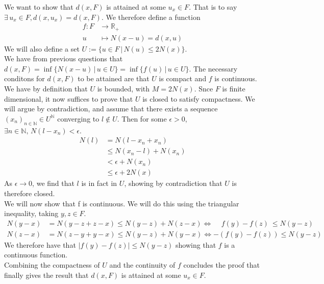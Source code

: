 \documentclass{article}
\begin{document}
We want to show that $d(x,F)$ is attained at some $u_x\in F$. That is to say $\exists \, u_x \in F, d(x,u_x) = d(x,F)$. We therefore define a function
	\begin{align*}
	f: F &\to \mathbb{R}_+\\
	u &\mapsto N(x-u) = d(x,u)
	\end{align*}
We will also define a set $U := \{u \in F \, | \, N(u) \leq 2N(x)\}$.\\ 
\noindent We have from previous questions that $d(x,F) = \inf\{ N(x-u) \, | \, u \in U\} = \inf\{ f(u) \, | \, u \in U\}$. The necessary conditons for $d(x,F)$ to be attained are that $U$ is compact and $f$ is continuous.\\
\noindent We have by definition that $U$ is bounded, with $M = 2N(x)$. Snce $F$ is finite dimensional, it now suffices to prove that $U$ is closed to satisfy compactness. We will argue by contradiction, and assume that there exists a sequence $(x_n)_{n \in \mathbb{N}} \in U^{\mathbb{N}}$ converging to $l \not \in U$. Then for some $\epsilon > 0$, $\exists n \in \mathbb{N}, \, N(l-x_n) < \epsilon$.
\begin{align*}
	N(l) &= N(l-x_n+x_n) \\
	&\leq N(x_n -l) + N(x_n) \\
	&< \epsilon + N(x_n) \\
	&\leq  \epsilon + 2N(x)
\end{align*}
As $\epsilon \rightarrow 0$, we find that $l$ is in fact in $U$, showing by contradiction that $U$ is therefore closed.\\
\noindent We will now show that f is continuous. We will do this using the triangular inequality, taking $y, z \in F$. 
	\begin{align*}
		N(y-x) &= N(y-z+z-x) \leq N(y-z) + N(z-x) \Leftrightarrow \quad \, f(y) - f(z) \ \leq N(y-z)\\
		N(z-x) &= N(z-y+y-x) \leq N(y-z) + N(y-x) \Leftrightarrow -(f(y) - f(z)) \leq N(y-z)
	\end{align*}
We therefore have that $|f(y) - f(z)| \leq N(y-z)$ showing that $f$ is a continuous function.\\
\noindent Combining the compactness of $U$ and the continuity of $f$ concludes the proof that  finally gives the result that $d(x,F)$ is attained at some $u_x\in F$.
\end{document}
